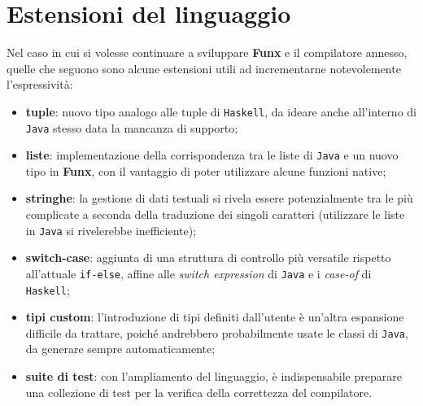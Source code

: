 \section{Estensioni del linguaggio}
\label{sec:6-2-language-extensions}

Nel caso in cui si volesse continuare a sviluppare \textbf{Funx} e il compilatore annesso,
quelle che seguono sono alcune estensioni utili ad incrementarne notevolemente l'espressività:
\begin{itemize}
    \item \textbf{tuple}: nuovo tipo analogo alle tuple di \texttt{Haskell}, da ideare anche all'interno di \texttt{Java}
          stesso data la mancanza di supporto;
    \item \textbf{liste}: implementazione della corrispondenza tra le liste di \texttt{Java} e un nuovo tipo in \textbf{Funx},
          con il vantaggio di poter utilizzare alcune funzioni native;
    \item \textbf{stringhe}: la gestione di dati testuali si rivela essere potenzialmente tra le più complicate a seconda
          della traduzione dei singoli caratteri (utilizzare le liste in \texttt{Java} si rivelerebbe inefficiente);
    \item \textbf{switch-case}: aggiunta di una struttura di controllo più versatile rispetto all'attuale \texttt{if-else},
          affine alle \textit{switch expression} di \texttt{Java} e i \textit{case-of} di \texttt{Haskell};
    \item \textbf{tipi custom}: l'introduzione di tipi definiti dall'utente è un'altra espansione difficile da trattare,
          poiché andrebbero probabilmente usate le classi di \texttt{Java}, da generare sempre automaticamente;
    \item \textbf{suite di test}: con l'ampliamento del linguaggio, è indispensabile preparare una collezione di test
          per la verifica della correttezza del compilatore.
\end{itemize}